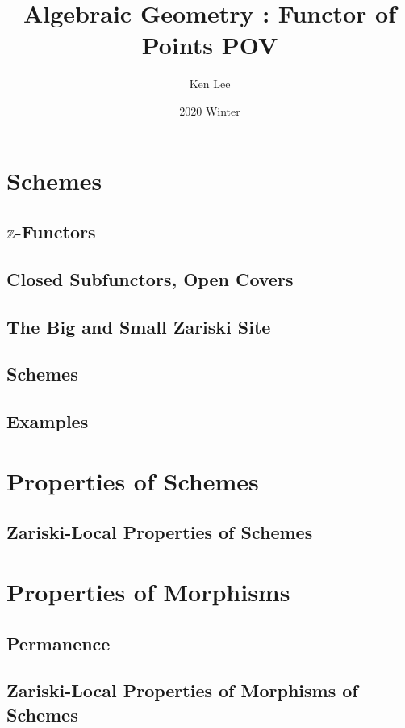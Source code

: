 \documentclass{article}
\begin{document}
\title{Algebraic Geometry : Functor of Points POV}

\author{Ken Lee}
\date{2020 Winter}
\maketitle

\tableofcontents



\newpage
\section{Schemes}
\subsection{$\mathbb{Z}$-Functors}
\subsection{Closed Subfunctors, Open Covers}
\subsection{The Big and Small Zariski Site}
\subsection{Schemes}
\subsection{Examples}
\newpage
\section{Properties of Schemes}
\subsection{Zariski-Local Properties of Schemes}
  
\newpage
\section{Properties of Morphisms}
\subsection{Permanence}
\subsection{Zariski-Local Properties of Morphisms of Schemes}
  
\end{document}
